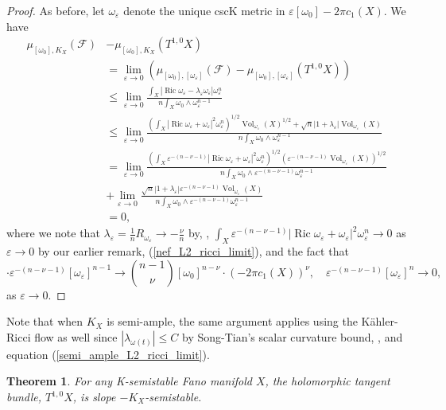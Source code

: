 \documentclass[12pt]{article}
\newtheorem{theorem}{Theorem}[section]
\numberwithin{equation}{section}
\newcommand{\e}{\varepsilon}
\DeclareMathOperator{\Ric}{Ric}
\DeclareMathOperator{\Vol}{Vol}
\begin{document}
\begin{proof}
As before, let $\omega_\e$ denote the unique cscK metric in $\e [\omega_0] - 2\pi c_1(X)$. We have
\begin{align*}
    \mu_{[\omega_0], K_X}(\mathcal{F}) &- \mu_{[\omega_0], K_X}(T^{1,0} X)\\ &= \lim_{\e \to 0} \left(\mu_{[\omega_0], [\omega_\e]}(\mathcal{F}) - \mu_{[\omega_0], [\omega_\e]}(T^{1,0} X) \right)\\
    &\leq \lim_{\e \to 0} \frac{\int_X |\Ric \omega_{\e} - \lambda_{\e} \omega_{\e}| \omega_\e^n}{n \int_X \omega_0 \wedge \omega_{\e}^{n-1}}\\
    &\leq \lim_{\e \to 0 } \frac{\left(\int_X |\Ric \omega_{\e} + \omega_{\e}|^2 \omega_\e^n\right)^{1/2} \Vol_{\omega_{\e}}(X)^{1/2} + \sqrt{n}|1 + \lambda_{\e}| \Vol_{\omega_{\e}}(X)}{n \int_X \omega_0 \wedge \omega_{\e}^{n-1}}\\
    &=\lim_{\e \to 0} \frac{\left(\int_X \e^{-(n-\nu-1)}|\Ric \omega_{\e} + \omega_{\e}|^2 \omega_\e^n\right)^{1/2} (\e^{-(n-\nu-1)}\Vol_{\omega_{\e}}(X))^{1/2}}{n \int_X \omega_0 \wedge \e^{-(n-\nu-1)}\omega_{\e}^{n-1}}\\
    &+ \lim_{\e \to 0} \frac{\sqrt{n}|1 + \lambda_{\e}| \e^{-(n-\nu-1)}\Vol_{\omega_{\e}}(X)}{n \int_X \omega_0 \wedge \e^{-(n-\nu-1)}\omega_{\e}^{n-1}}\\
    &= 0,
\end{align*}
where we note that $\lambda_{\e} = \frac{1}{n}R_{\omega_\e}\to -\frac{\nu}{n}$ by, \cite{L23}, $\int_X \e^{-(n-\nu-1)}|\Ric \omega_{\e} + \omega_{\e}|^2 \omega_{\e}^n \to 0$ as $\e \to 0$ by our earlier remark, (\ref{nef_L2_ricci_limit}), and the fact that
\begin{equation*}
    [\omega_0] \cdot \e^{-(n-\nu-1)}[\omega_\e]^{n-1} \to {n-1 \choose \nu} [\omega_0]^{n-\nu} \cdot (-2 \pi c_1(X))^\nu, \quad \e^{-(n-\nu-1)}[\omega_\e]^n \to 0,
\end{equation*}
as $\e \to 0$.
\end{proof}

\noindent Note that when $K_X$ is semi-ample, the same argument applies using the K\"ahler-Ricci flow as well since $|\lambda_{\omega(t)}| \leq C$ by Song-Tian's scalar curvature bound, \cite{ST16}, and equation (\ref{semi_ample_L2_ricci_limit}).

\begin{theorem}
For any K-semistable Fano manifold $X$, the holomorphic tangent bundle, $T^{1,0} X$, is slope $-K_X$-semistable.
\end{theorem}
\end{document}
